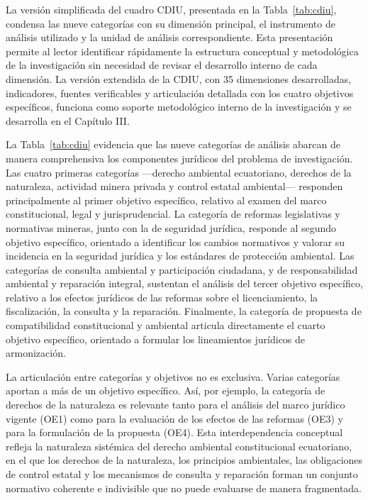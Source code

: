 La versión simplificada del cuadro CDIU, presentada en la Tabla~\ref{tab:cdiu}, condensa las nueve categorías con su dimensión principal, el instrumento de análisis utilizado y la unidad de análisis correspondiente. Esta presentación permite al lector identificar rápidamente la estructura conceptual y metodológica de la investigación sin necesidad de revisar el desarrollo interno de cada dimensión. La versión extendida de la CDIU, con 35 dimensiones desarrolladas, indicadores, fuentes verificables y articulación detallada con los cuatro objetivos específicos, funciona como soporte metodológico interno de la investigación y se desarrolla en el Capítulo III.



La Tabla~\ref{tab:cdiu} evidencia que las nueve categorías de análisis abarcan de manera comprehensiva los componentes jurídicos del problema de investigación. Las cuatro primeras categorías ---derecho ambiental ecuatoriano, derechos de la naturaleza, actividad minera privada y control estatal ambiental--- responden principalmente al primer objetivo específico, relativo al examen del marco constitucional, legal y jurisprudencial. La categoría de reformas legislativas y normativas mineras, junto con la de seguridad jurídica, responde al segundo objetivo específico, orientado a identificar los cambios normativos y valorar su incidencia en la seguridad jurídica y los estándares de protección ambiental. Las categorías de consulta ambiental y participación ciudadana, y de responsabilidad ambiental y reparación integral, sustentan el análisis del tercer objetivo específico, relativo a los efectos jurídicos de las reformas sobre el licenciamiento, la fiscalización, la consulta y la reparación. Finalmente, la categoría de propuesta de compatibilidad constitucional y ambiental articula directamente el cuarto objetivo específico, orientado a formular los lineamientos jurídicos de armonización.

La articulación entre categorías y objetivos no es exclusiva. Varias categorías aportan a más de un objetivo específico. Así, por ejemplo, la categoría de derechos de la naturaleza es relevante tanto para el análisis del marco jurídico vigente (OE1) como para la evaluación de los efectos de las reformas (OE3) y para la formulación de la propuesta (OE4). Esta interdependencia conceptual refleja la naturaleza sistémica del derecho ambiental constitucional ecuatoriano, en el que los derechos de la naturaleza, los principios ambientales, las obligaciones de control estatal y los mecanismos de consulta y reparación forman un conjunto normativo coherente e indivisible que no puede evaluarse de manera fragmentada.

